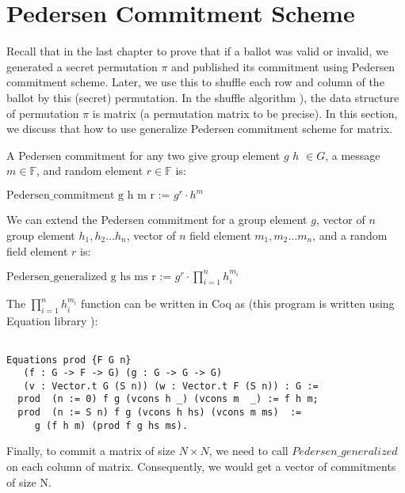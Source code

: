 \section{Pedersen Commitment Scheme}
\label{sec:pedersen}
Recall that in the last chapter to prove that if a ballot was valid or invalid, we generated a secret permutation $\pi$ and published its commitment using 
Pedersen commitment scheme. Later, we use this to shuffle each row and column of the ballot by this (secret) permutation. 
In the shuffle algorithm \citep{Wikstrom:2009:CPS}), the data structure of permutation $\pi$ is matrix (a permutation matrix to be precise).
In this section, we discuss that how to use generalize Pedersen commitment scheme for matrix. 

A Pedersen commitment for any two give group element $g$ $h$ $\in G$, a message $m \in \mathbb{F}$, and random element 
$r \in \mathbb{F}$ is:

\begin{displayquote}

$\text{Pedersen\_commitment  g h m r := } g^r \cdot h^m$  

\end{displayquote}

We can extend the Pedersen commitment for a group element $g$, 
vector of $n$ group element $h_{1}, h_{2} \dots h_{n}$, vector of $n$ 
field element $m_{1}, m_{2} \dots m_{n}$, and a random field element 
$r$ is:

\begin{displayquote}

$\text{Pedersen\_generalized g hs ms r := } g^r \cdot \prod_{i = 1}^n  h_{i}^{m_{i}}$  

\end{displayquote}

The $\prod_{i = 1}^n  h_{i}^{m_{i}}$ function can be written in Coq as 
(this program is written using Equation library \citep{Sozeau:2019:ERH:3352468.3341690}):

\begin{verbatim}

Equations prod {F G n}  
   (f : G -> F -> G) (g : G -> G -> G)
   (v : Vector.t G (S n)) (w : Vector.t F (S n)) : G :=
  prod  (n := 0) f g (vcons h _) (vcons m  _) := f h m;
  prod  (n := S n) f g (vcons h hs) (vcons m ms)  := 
     g (f h m) (prod f g hs ms).

\end{verbatim}

Finally, to commit a matrix of size $N \times N$, we need to call 
$Pedersen\_generalized$ on each column of matrix. Consequently, 
we  would get a vector of commitments of size N.


